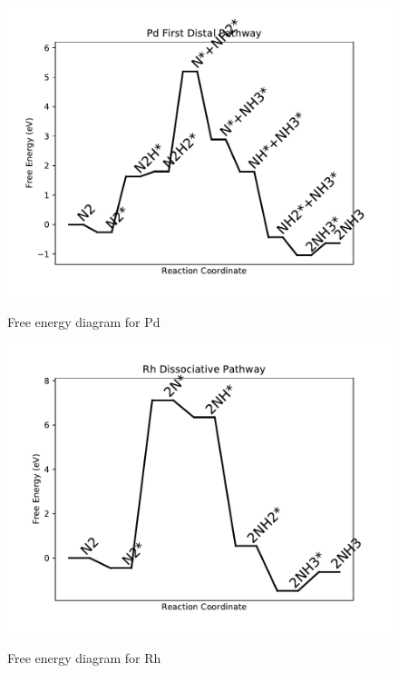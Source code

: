 \documentclass[journal=jacsat,manuscript=article]{achemso}
\begin{document}
\begin{figure}
\includegraphics[width=1\linewidth]{data/plots/Pd_distal_1.pdf}
\label{fig:Pd_distal_1}
\caption{Free energy diagram for Pd}
\end{figure}

\newpage
\begin{figure}
\includegraphics[width=1\linewidth]{data/plots/Rh_dissociative.pdf}
\label{fig:Rh_dissociative}
\caption{Free energy diagram for Rh}
\end{figure}
\end{document}
